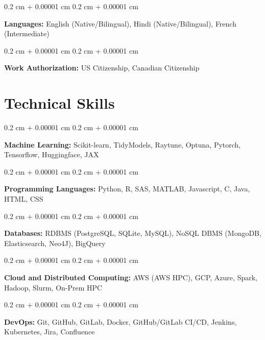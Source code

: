 \documentclass[10pt, letterpaper]{article}
\newenvironment{onecolentry}{
    \begin{adjustwidth}{
        0.2 cm + 0.00001 cm
    }{
        0.2 cm + 0.00001 cm
    }
}{
    \end{adjustwidth}
} %
\begin{document}
        
        \begin{onecolentry}
            \textbf{Languages:} English (Native/Bilingual), Hindi (Native/Bilingual), French (Intermediate)
        \end{onecolentry}

        \vspace{0.2 cm}

        \begin{onecolentry}
            \textbf{Work Authorization:} US Citizenship, Canadian Citizenship
        \end{onecolentry}


    
    \section{Technical Skills}



        
        \begin{onecolentry}
            \textbf{Machine Learning:} Scikit-learn, TidyModels, Raytune, Optuna, Pytorch, Tensorflow, Huggingface, JAX
        \end{onecolentry}

        \vspace{0.2 cm}

        \begin{onecolentry}
            \textbf{Programming Languages:} Python, R, SAS, MATLAB, Javascript, C, Java, HTML, CSS
        \end{onecolentry}

        \vspace{0.2 cm}

        \begin{onecolentry}
            \textbf{Databases:} RDBMS (PostgreSQL, SQLite, MySQL), NoSQL DBMS (MongoDB, Elasticsearch, Neo4J), BigQuery
        \end{onecolentry}

        \vspace{0.2 cm}

        \begin{onecolentry}
            \textbf{Cloud and Distributed Computing:} AWS (AWS HPC), GCP, Azure, Spark, Hadoop, Slurm, On-Prem HPC
        \end{onecolentry}

        \vspace{0.2 cm}

        \begin{onecolentry}
            \textbf{DevOps:} Git, GitHub, GitLab, Docker, GitHub/GitLab CI/CD, Jenkins, Kubernetes, Jira, Confluence
        \end{onecolentry}
\end{document}
